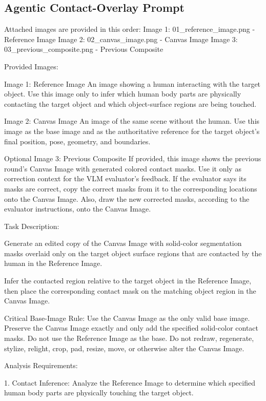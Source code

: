 \subsection{Agentic Contact-Overlay Prompt}
\label{app:prompt-contact-overlay}

\begin{promptblock}
Attached images are provided in this order:
Image 1: 01_reference_image.png - Reference Image
Image 2: 02_canvas_image.png - Canvas Image
Image 3: 03_previous_composite.png - Previous Composite

Provided Images:

Image 1: Reference Image
An image showing a human interacting with the target object. Use this image only to infer which human body parts are physically contacting the target object and which object-surface regions are being touched.

Image 2: Canvas Image
An image of the same scene without the human. Use this image as the base image and as the authoritative reference for the target object's final position, pose, geometry, and boundaries.

Optional Image 3: Previous Composite
If provided, this image shows the previous round's Canvas Image with generated colored contact masks. Use it only as correction context for the VLM evaluator's feedback. If the evaluator says its masks are correct, copy the correct masks from it to the corresponding locations onto the Canvas Image. Also, draw the new corrected masks, according to the evaluator instructions, onto the Canvas Image.

Task Description:

Generate an edited copy of the Canvas Image with solid-color segmentation masks overlaid only on the target object surface regions that are contacted by the human in the Reference Image.

Infer the contacted region relative to the target object in the Reference Image, then place the corresponding contact mask on the matching object region in the Canvas Image.

Critical Base-Image Rule:
Use the Canvas Image as the only valid base image. Preserve the Canvas Image exactly and only add the specified solid-color contact masks. Do not use the Reference Image as the base. Do not redraw, regenerate, stylize, relight, crop, pad, resize, move, or otherwise alter the Canvas Image.

Analysis Requirements:

1. Contact Inference:
   Analyze the Reference Image to determine which specified human body parts are physically touching the target object.


\end{promptblock}
